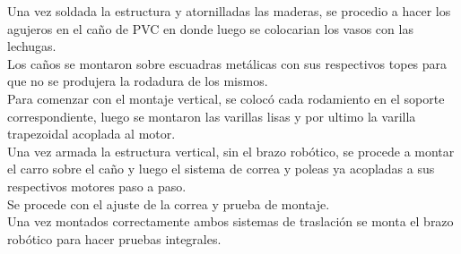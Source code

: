 Una vez soldada la estructura y atornilladas las maderas, se procedio a hacer los agujeros en el caño de PVC en donde luego se colocarian los vasos con las lechugas.\\
Los caños se montaron sobre escuadras metálicas con sus respectivos topes para que no se produjera la rodadura de los mismos.\\
Para comenzar con el montaje vertical, se colocó cada rodamiento en el soporte correspondiente, luego se montaron las varillas lisas y por ultimo la varilla trapezoidal acoplada al motor.\\
Una vez armada la estructura vertical, sin el brazo robótico, se procede a montar el carro sobre el caño y luego el sistema de correa y poleas ya acopladas a sus respectivos motores paso a paso.\\
Se procede con el ajuste de la correa y prueba de montaje.\\
Una vez montados correctamente ambos sistemas de traslación se monta el brazo robótico para hacer pruebas integrales.\\